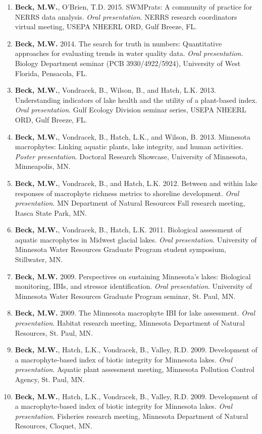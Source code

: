 \documentclass[letterpaper,12pt]{article}
\begin{document}
\begin{enumerate}
\item {\bf Beck, M.W.}, O'Brien, T.D. 2015. SWMPrats: A community of practice for NERRS data analysis. \textit{Oral presentation}. NERRS research coordinators virtual meeting, USEPA NHEERL ORD, Gulf Breeze, FL.

\item {\bf Beck, M.W.} 2014. The search for truth in numbers: Quantitative approaches for evaluating trends in water quality data. \textit{Oral presentation}. Biology Department seminar (PCB 3930/4922/5924), University of West Florida, Pensacola, FL. 

\item {\bf Beck, M.W.}, Vondracek, B., Wilson, B., and Hatch, L.K. 2013. Understanding indicators of lake health and the utility of a plant-based index. \textit{Oral presentation}. Gulf Ecology Division seminar series, USEPA NHEERL ORD, Gulf Breeze, FL.

\item {\bf Beck, M.W.}, Vondracek, B., Hatch, L.K., and Wilson, B. 2013. Minnesota macrophytes: Linking aquatic plants, lake integrity, and human activities. \textit{Poster presentation}. Doctoral Research Showcase, University of Minnesota, Minneapolis, MN.

\item {\bf Beck, M.W.}, Vondracek, B., and Hatch, L.K. 2012. Between and within lake responses of macrophyte richness metrics to shoreline development. \textit{Oral presentation}. MN Department of Natural Resources Fall research meeting, Itasca State Park, MN.

\item {\bf Beck, M.W.}, Vondracek, B., Hatch, L.K. 2011. Biological assessment of aquatic macrophytes in Midwest glacial lakes. \textit{Oral presentation}. University of Minnesota Water Resources Graduate Program student symposium, Stillwater, MN.

\item {\bf Beck, M.W.} 2009. Perspectives on sustaining Minnesota's lakes: Biological monitoring, IBIs, and stressor identification. \textit{Oral presentation}. University of Minnesota Water Resources Graduate Program seminar, St. Paul, MN.

\item {\bf Beck, M.W.} 2009. The Minnesota macrophyte IBI for lake assessment. \textit{Oral presentation}. Habitat research meeting, Minnesota Department of Natural Resources, St. Paul, MN.

\item {\bf Beck, M.W.}, Hatch, L.K., Vondracek, B., Valley, R.D. 2009. Development of a macrophyte-based index of biotic integrity for Minnesota lakes. \textit{Oral presentation}. Aquatic plant assessment meeting, Minnesota Pollution Control Agency, St. Paul, MN.

\item {\bf Beck, M.W.}, Hatch, L.K., Vondracek, B., Valley, R.D. 2009. Development of a macrophyte-based index of biotic integrity for Minnesota lakes. \textit{Oral presentation}. Fisheries research meeting, Minnesota Department of Natural Resources, Cloquet, MN.

\end{enumerate}
\end{document}
